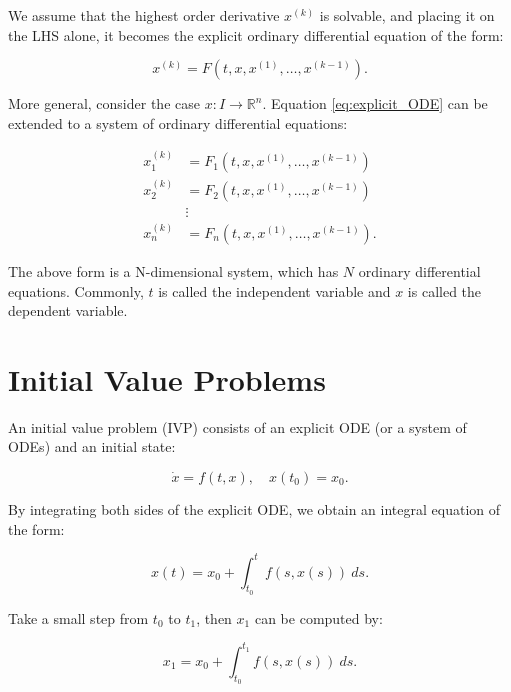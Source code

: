 \documentclass[
	parskip, 			   %
	twoside, 			   %
	DIV=14, 			   %
	BCOR=15.0mm, 		   %
	headsepline, 		   %
	open=right, 		   %
	captions=tableheading, %
	bibliography=totoc,    %
	numbers=noenddot       %
]{scrreprt}
\begin{document}
We assume that the highest order derivative $x^{(k)}$ is solvable, and placing it on the LHS alone, it becomes the explicit ordinary differential equation of the form:

\begin{equation}
    \label{eq:explicit_ODE}
    x^{(k)} = F\left(t, x, x^{(1)}, \ldots, x^{(k-1)}\right).
\end{equation}

More general, consider the case $x: I \rightarrow \mathbb{R}^{n}$. Equation \ref{eq:explicit_ODE} can be extended to a system of ordinary differential equations:

\begin{equation}
    \label{eq:ODE_system}
    \begin{aligned}
    x_{1}^{(k)} &=F_{1}\left(t, x, x^{(1)}, \ldots, x^{(k-1)}\right) \\
    x_{2}^{(k)} &=F_{2}\left(t, x, x^{(1)}, \ldots, x^{(k-1)}\right) \\
    & \vdots \\
    x_{n}^{(k)} &=F_{n}\left(t, x, x^{(1)}, \ldots, x^{(k-1)}\right).
\end{aligned}
\end{equation}

The above form is a N-dimensional system, which has $N$ ordinary differential equations. Commonly, $t$ is called the independent variable and $x$ is called the dependent variable.

\section{Initial Value Problems}
An initial value problem (IVP) consists of an explicit ODE (or a system of ODEs) and an initial state:

\begin{equation}
    \label{eq:IVP}
    \dot{x} = f(t, x), \quad x(t_{0})=x_{0}.
\end{equation}

By integrating both sides of the explicit ODE, we obtain an integral equation of the form:

\begin{equation}
    \label{eq:solution_IVP}
    x(t) = x_{0} + \int_{t_{0}}^{t} f(s, x(s))\:ds.
\end{equation}

Take a small step from $t_{0}$ to $t_{1}$, then $x_{1}$ can be computed by:

\begin{equation}
    \label{eq:solution_IVP_first_step}
    x_{1} = x_{0} + \int_{t_{0}}^{t_{1}} f(s, x(s))\:ds.
\end{equation}
\end{document}
